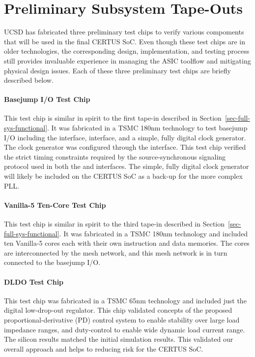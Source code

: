 
\section{Preliminary Subsystem Tape-Outs}

UCSD has fabricated three preliminary test chips to verify various
compoments that will be used in the final CERTUS SoC. Even though these
test chips are in older technologies, the corresponding design,
implementation, and testing process still provides invaluable experience
in managing the ASIC toolflow and mitigating physical design issues. Each
of these three preliminary test chips are briefly described below.

\paragraph{Basejump I/O Test Chip}
This test chip is similar in spirit to the first tape-in described in
Section~\ref{sec-full-sys-functional}. It was fabricated in a TSMC 180nm
technology to test basejump I/O including the  interface,
 interface, and a simple, fully digital clock generator. The
clock generator was configured through the  interface. This
test chip verified the strict timing constraints required by the
source-synchronous signaling protocol used in both the  and
 interfaces. The simple, fully digital clock generator will
likely be included on the CERTUS SoC as a back-up for the more complex
PLL.

\paragraph{Vanilla-5 Ten-Core Test Chip}
This test chip is similar in spirit to the third tape-in described in
Section~\ref{sec-full-sys-functional}. It was fabricated in a TSMC 180nm
technology and included ten Vanilla-5 cores each with their own
instruction and data memories. The cores are interconnected by the mesh
network, and this mesh network is in turn connected to the basejump I/O.

\paragraph{DLDO Test Chip}
This test chip was fabricated in a TSMC 65nm technology and included just
the digital low-drop-out regulator. This chip validated concepts of the proposed proportional-derivative (PD)
control system to enable stability over large load impedance ranges, and
duty-control to enable wide dynamic load current range. The silicon
results matched the initial simulation results. This validated our
overall approach and helps to reducing risk for the CERTUS SoC.

